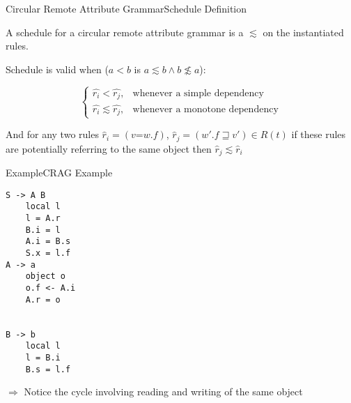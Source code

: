 \begin{frame}{Circular Remote Attribute Grammar}{Schedule Definition}
    
\begin{definition}
A schedule for a circular remote attribute grammar is a \alert{\customorder{}} $\lesssim$ on the \alert{instantiated rules}.
\end{definition}


Schedule is valid when ($a < b$ is $a \lesssim b \wedge b \not \lesssim a$):

\[\begin{cases}
      \hat{r_i} < \hat{r_j},    & \text{whenever a simple dependency} \\
      \hat{r_i} \lesssim \hat{r_j}, & \text{whenever a monotone dependency}
    \end{cases}\]

    And for any two rules $\hat{r}_i = (v \texttt{=} w.f)$, $\hat{r}_j = (w'.f \sqsupseteq v' ) \in R(t)$ if these rules are \alert{potentially} referring to the same object then $\hat{r}_j \lesssim \hat{r}_i$ 

\end{frame}




\begin{frame}[fragile=singleslide]{Example}{CRAG Example}

\begin{multicols}{3}
\begin{Verbatim}[fontsize=\small]
S -> A B
    local l
    l = A.r
    B.i = l
    A.i = B.s
    S.x = l.f
A -> a
    object o
    o.f <- A.i
    A.r = o


B -> b
    local l
    l = B.i
    B.s = l.f
\end{Verbatim}
\end{multicols}

\newlinevspace

$\Rightarrow$ Notice the \alert{cycle} involving reading and writing of the same object

\end{frame}

